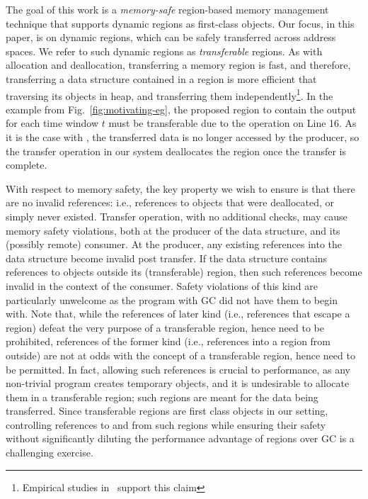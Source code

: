 The goal of this work is a \emph{memory-safe} region-based memory
management technique that supports dynamic regions as first-class
objects. Our focus, in this paper, is on dynamic regions, which can be
safely transferred across address spaces. We refer to such dynamic
regions as \emph{transferable} regions. As with allocation and
deallocation, transferring a memory region is fast, and therefore,
transferring a data structure contained in a region is more efficient
that traversing its objects in heap, and transferring them
independently\footnote{Empirical studies in~\cite{Broom:HotOS} support
this claim}. In the  example from
Fig.~\ref{fig:motivating-eg}, the proposed region to contain the
output for each time window $t$ must be transferable due to the
 operation on Line 16. As it is the case with
, the transferred data is no longer accessed by the
producer, so the transfer operation in our system deallocates the
region once the transfer is complete.

With respect to memory safety, the key property we wish to ensure is
that there are no invalid references: i.e., references to objects that
were deallocated, or simply never existed. Transfer operation, with no
additional checks, may cause memory safety violations, both at the
producer of the data structure, and its (possibly remote) consumer. At
the producer, any existing references into the data structure become
invalid post transfer. If the data structure contains references to
objects outside its (transferable) region, then such references become
invalid in the context of the consumer. Safety violations of this kind
are particularly unwelcome as the program with GC did not have them to
begin with. Note that, while the references of later kind (i.e.,
references that escape a region) defeat the very purpose of a
transferable region, hence need to be prohibited, references of the
former kind (i.e., references into a region from outside) are not at
odds with the concept of a transferable region, hence need to be
permitted. In fact, allowing such references is crucial to
performance, as any non-trivial program creates temporary objects, and
it is undesirable to allocate them in a transferable region; such
regions are meant for the data being transferred. Since transferable
regions are first class objects in our setting, controlling references
to and from such regions while ensuring their safety without
significantly diluting the performance advantage of regions over GC is
a challenging exercise.

